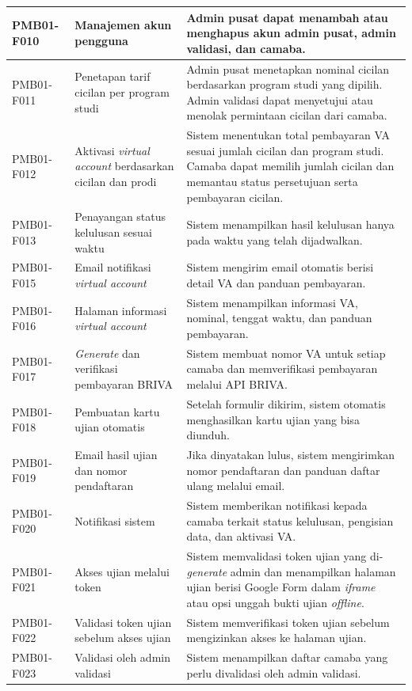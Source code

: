 \begin{longtable}{|p{}|p{}|p{}|}
	\hline
	PMB01-F010 & Manajemen akun pengguna & Admin pusat dapat menambah atau menghapus akun admin pusat, admin validasi, dan camaba. \\
	\hline
	PMB01-F011 & Penetapan tarif cicilan per program studi & Admin pusat menetapkan nominal cicilan berdasarkan program studi yang dipilih. Admin validasi dapat menyetujui atau menolak permintaan cicilan dari camaba. \\
	\hline
	PMB01-F012 & Aktivasi \textit{virtual account} berdasarkan cicilan dan prodi & Sistem menentukan total pembayaran VA sesuai jumlah cicilan dan program studi. Camaba dapat memilih jumlah cicilan dan memantau status persetujuan serta pembayaran cicilan. \\
	\hline
	PMB01-F013 & Penayangan status kelulusan sesuai waktu & Sistem menampilkan hasil kelulusan hanya pada waktu yang telah dijadwalkan. \\
	\hline
	PMB01-F015 & Email notifikasi \textit{virtual account} & Sistem mengirim email otomatis berisi detail VA dan panduan pembayaran. \\
	\hline
	PMB01-F016 & Halaman informasi \textit{virtual account} & Sistem menampilkan informasi VA, nominal, tenggat waktu, dan panduan pembayaran. \\
	\hline
	PMB01-F017 & \textit{Generate} dan verifikasi pembayaran BRIVA & Sistem membuat nomor VA untuk setiap camaba dan memverifikasi pembayaran melalui API BRIVA. \\
	\hline
	PMB01-F018 & Pembuatan kartu ujian otomatis & Setelah formulir dikirim, sistem otomatis menghasilkan kartu ujian yang bisa diunduh. \\
	\hline
	PMB01-F019 & Email hasil ujian dan nomor pendaftaran & Jika dinyatakan lulus, sistem mengirimkan nomor pendaftaran dan panduan daftar ulang melalui email. \\
	\hline
	PMB01-F020 & Notifikasi sistem & Sistem memberikan notifikasi kepada camaba terkait status kelulusan, pengisian data, dan aktivasi VA. \\
	\hline
	PMB01-F021 & Akses ujian melalui token & Sistem memvalidasi token ujian yang di-\textit{generate} admin dan menampilkan halaman ujian berisi Google Form dalam \textit{iframe} atau opsi unggah bukti ujian \textit{offline}. \\
	\hline
	PMB01-F022 & Validasi token ujian sebelum akses ujian & Sistem memverifikasi token ujian sebelum mengizinkan akses ke halaman ujian. \\
	\hline
	PMB01-F023 & Validasi oleh admin validasi & Sistem menampilkan daftar camaba yang perlu divalidasi oleh admin validasi. \\

\end{longtable}
